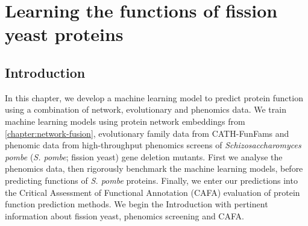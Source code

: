
\chapter{Learning the functions of fission yeast proteins}
\label{chapter:yeast}



\section{Introduction}

In this chapter, we develop a machine learning model to predict protein function using a combination of network, evolutionary and phenomics data. We train machine learning models using protein network embeddings from \ref{chapter:network-fusion}, evolutionary family data from CATH-FunFams and phenomic data from high-throughput phenomics screens of \emph{Schizosaccharomyces pombe} (\emph{S. pombe}; fission yeast) gene deletion mutants. First we analyse the phenomics data, then rigorously benchmark the machine learning models, before predicting functions of \emph{S. pombe} proteins. Finally, we enter our predictions into the Critical Assessment of Functional Annotation (CAFA) evaluation of protein function prediction methods. We begin the Introduction with pertinent information about fission yeast, phenomics screening and CAFA.

